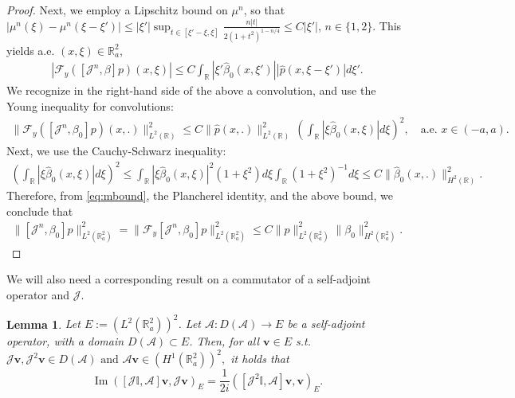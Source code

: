 \documentclass[report]{elsarticle}
\newtheorem{lemma}[theorem]{Lemma}
\numberwithin{theorem}{section}
\renewcommand{\Im}{\operatorname{Im}}
\renewcommand{\vec}[1]{\mathbf{#1}}
\begin{document}
\begin{proof}
	
	Next, we employ a Lipschitz bound on $\mu^n$, so that $|\mu^n(\xi)-\mu^n(\xi-\xi')|\leq |\xi'|\sup_{t\in [\xi'-\xi, \xi]}\frac{n|t|}{2(1+t^2)^{1-n/4}}\leq C|\xi'|$, $n\in \{1,2\}$. This yields a.e. $(x,\xi)\in \mathbb{R}^2_a$, 
	\begin{align*}
		|\mathcal{F}_y\left([\mathcal{J}^n,\beta]p\right)(x,\xi)|\leq C\int_{\mathbb{R}}|\xi'\hat{\beta}_0(x,\xi')| |\hat{p}(x,\xi-\xi')|d\xi'.
	\end{align*}
	We recognize in the right-hand side of the above a convolution, and use the Young inequality for convolutions: 
	\begin{align}
		\label{eq:mbound}
		\|\mathcal{F}_y\left([\mathcal{J}^n,{\beta}_0]p\right)(x,.)\|_{L^2(\mathbb{R})}^2\leq C \|\hat{p}(x,.)\|_{L^2(\mathbb{R})}^2\, \left(\int_{\mathbb{R}}|\xi\hat{\beta}_0(x,\xi)|d\xi\right)^2, \quad \text{a.e. }x\in (-a,a).
	\end{align}
	Next, we use the Cauchy-Schwarz inequality:
	\begin{align*}
		\left(\int_{\mathbb{R}}|\xi\hat{\beta}_0(x,\xi)|d\xi\right)^2\leq \int_{\mathbb{R}}|\xi \hat{\beta}_0(x,\xi)|^2(1+\xi^2)d\xi \int_{\mathbb{R}}(1+\xi^2)^{-1}d\xi\leq C\|\hat{\beta}_0(x,.)\|_{H^{2}(\mathbb{R})}^2.
	\end{align*}
	Therefore, from \eqref{eq:mbound}, the Plancherel identity, and the above bound, we conclude that 
	\begin{align*}
		\|[\mathcal{J}^n,\beta_0]p\|_{L^2(\mathbb{R}^2_a)}^2=	\|\mathcal{F}_y[\mathcal{J}^n,\beta_0]p\|_{L^2(\mathbb{R}^2_a)}^2\leq C\|p\|^2_{L^2(\mathbb{R}^2_a)}\|\beta_0\|^2_{H^2(\mathbb{R}^2_a)}.
	\end{align*}
\end{proof}
We will also need a corresponding result on a commutator of a self-adjoint operator and $\mathcal{J}$.  
\begin{lemma}
	\label{lem:self_adjoint_commutator}
	Let $E:=(L^2(\mathbb{R}^2_a))^2$. 
	Let $\mathcal{A}: D(\mathcal{A})\rightarrow E$ be a self-adjoint operator, with a domain $D(\mathcal{A})\subset E$. Then, for all $\vec{v}\in E$ s.t. $\mathcal{J}\vec{v}, \mathcal{J}^2\vec{v}\in D(\mathcal{A}) \text{  and   }\mathcal{A}\vec{v}\in \left(H^1(\mathbb{R}^2_a)\right)^2,$ it holds that $$\Im ([\mathcal{J}\mathbb{I}, \mathcal{A}]\vec{v},\mathcal{J} \vec{v})_{E}=\frac{1}{2i}([\mathcal{J}^2\mathbb{I}, \mathcal{A}]\vec{v},\vec{v})_{E}.$$ 
\end{lemma}
\end{document}
